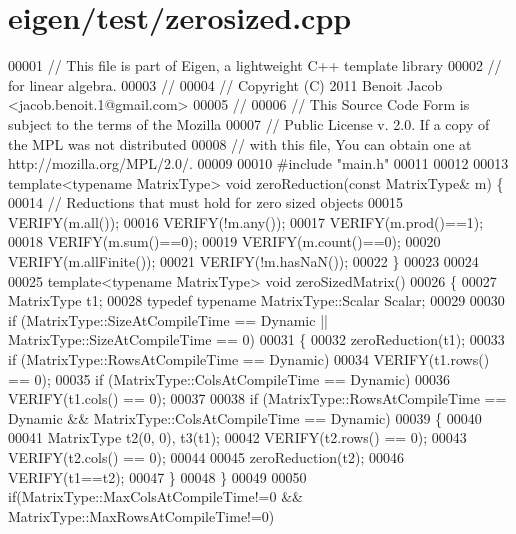 \hypertarget{eigen_2test_2zerosized_8cpp_source}{}\section{eigen/test/zerosized.cpp}
\label{eigen_2test_2zerosized_8cpp_source}

\begin{DoxyCode}
00001 \textcolor{comment}{// This file is part of Eigen, a lightweight C++ template library}
00002 \textcolor{comment}{// for linear algebra.}
00003 \textcolor{comment}{//}
00004 \textcolor{comment}{// Copyright (C) 2011 Benoit Jacob <jacob.benoit.1@gmail.com>}
00005 \textcolor{comment}{//}
00006 \textcolor{comment}{// This Source Code Form is subject to the terms of the Mozilla}
00007 \textcolor{comment}{// Public License v. 2.0. If a copy of the MPL was not distributed}
00008 \textcolor{comment}{// with this file, You can obtain one at http://mozilla.org/MPL/2.0/.}
00009 
00010 \textcolor{preprocessor}{#include "main.h"}
00011 
00012 
00013 \textcolor{keyword}{template}<\textcolor{keyword}{typename} MatrixType> \textcolor{keywordtype}{void} zeroReduction(\textcolor{keyword}{const} MatrixType& m) \{
00014   \textcolor{comment}{// Reductions that must hold for zero sized objects}
00015   VERIFY(m.all());
00016   VERIFY(!m.any());
00017   VERIFY(m.prod()==1);
00018   VERIFY(m.sum()==0);
00019   VERIFY(m.count()==0);
00020   VERIFY(m.allFinite());
00021   VERIFY(!m.hasNaN());
00022 \}
00023 
00024 
00025 \textcolor{keyword}{template}<\textcolor{keyword}{typename} MatrixType> \textcolor{keywordtype}{void} zeroSizedMatrix()
00026 \{
00027   MatrixType t1;
00028   \textcolor{keyword}{typedef} \textcolor{keyword}{typename} MatrixType::Scalar Scalar;
00029 
00030   \textcolor{keywordflow}{if} (MatrixType::SizeAtCompileTime == Dynamic || MatrixType::SizeAtCompileTime == 0)
00031   \{
00032     zeroReduction(t1);
00033     \textcolor{keywordflow}{if} (MatrixType::RowsAtCompileTime == Dynamic)
00034       VERIFY(t1.rows() == 0);
00035     \textcolor{keywordflow}{if} (MatrixType::ColsAtCompileTime == Dynamic)
00036       VERIFY(t1.cols() == 0);
00037 
00038     \textcolor{keywordflow}{if} (MatrixType::RowsAtCompileTime == Dynamic && MatrixType::ColsAtCompileTime == Dynamic)
00039     \{
00040 
00041       MatrixType t2(0, 0), t3(t1);
00042       VERIFY(t2.rows() == 0);
00043       VERIFY(t2.cols() == 0);
00044 
00045       zeroReduction(t2);
00046       VERIFY(t1==t2);
00047     \}
00048   \}
00049 
00050   \textcolor{keywordflow}{if}(MatrixType::MaxColsAtCompileTime!=0 && MatrixType::MaxRowsAtCompileTime!=0)

\end{DoxyCode}
